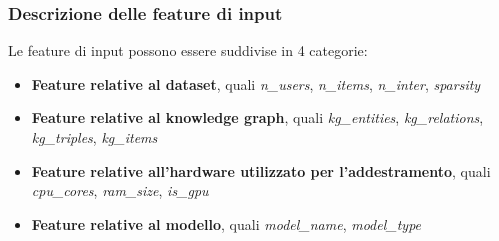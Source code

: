 \subsubsection{Descrizione delle feature di input}
Le feature di input possono essere suddivise in 4 categorie:
\begin{itemize}
    \item \textbf{Feature relative al dataset}, quali \textit{n\_users}, \textit{n\_items}, \textit{n\_inter}, \textit{sparsity}
    \item \textbf{Feature relative al knowledge graph}, quali \textit{kg\_entities}, \textit{kg\_relations}, \textit{kg\_triples}, \textit{kg\_items}
    \item \textbf{Feature relative all'hardware utilizzato per l'addestramento}, quali \textit{cpu\_cores}, \textit{ram\_size}, \textit{is\_gpu}
    \item \textbf{Feature relative al modello}, quali \textit{model\_name}, \textit{model\_type}
\end{itemize}

